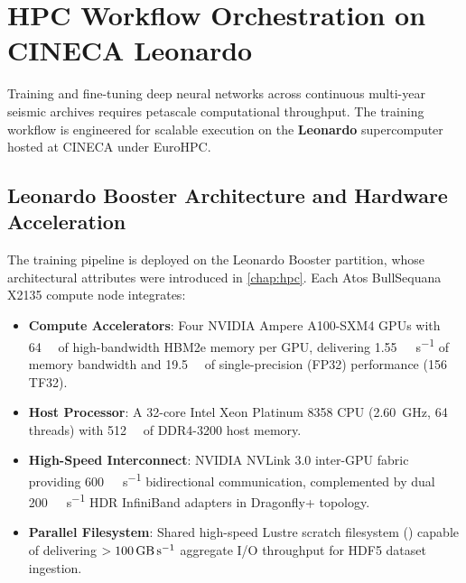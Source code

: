 \section{HPC Workflow Orchestration on CINECA Leonardo}
\label{sec:hpc_orchestration}

Training and fine-tuning deep neural networks across continuous
multi-year seismic
archives requires petascale computational throughput. The training workflow is
engineered for scalable execution on the \textbf{Leonardo} supercomputer hosted
at \ac{CINECA} under EuroHPC.

\subsection{Leonardo Booster Architecture and Hardware Acceleration}
\label{subsec:leonardo_booster}

The training pipeline is deployed on the Leonardo Booster partition, whose
architectural attributes were introduced in \cref{chap:hpc}. Each Atos
BullSequana X2135 compute node integrates:
\begin{itemize}
  \item \textbf{Compute Accelerators}: Four NVIDIA Ampere A100-SXM4
    \acp{GPU} with
    \qty{64}{\giga\byte} of high-bandwidth HBM2e memory per
    \ac{GPU}, delivering
    \qty{1.55}{\tera\byte\per\second} of memory bandwidth and
    \qty{19.5}{\tera{}}
    of single-precision (FP32) performance
    (\qty{156}{\tera{}} TF32).
  \item \textbf{Host Processor}: A \num{32}-core Intel Xeon Platinum
    8358 \ac{CPU}
    (\qty{2.60}{\giga\hertz}, \num{64} threads) with \qty{512}{\giga\byte} of
    DDR4-3200 host memory.
  \item \textbf{High-Speed Interconnect}: NVIDIA NVLink 3.0 inter-GPU fabric
    providing \qty{600}{\giga\byte\per\second} bidirectional communication,
    complemented by dual \qty{200}{\giga\bit\per\second} HDR
    InfiniBand adapters in Dragonfly+ topology.
  \item \textbf{Parallel Filesystem}: Shared high-speed Lustre
    scratch filesystem
    () capable of delivering $>
    \qty{100}{\giga\byte\per\second}$
    aggregate I/O throughput for HDF5 dataset ingestion.
\end{itemize}

